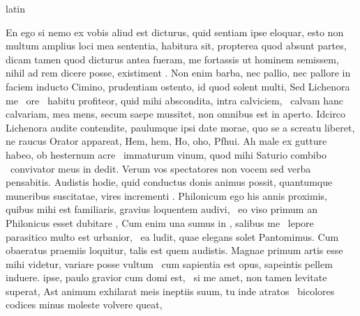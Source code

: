 \documentclass[12pt]{book}
\renewenvironment{latin}
    	{\begin{hyphenrules}{latin}}
    	{\end{hyphenrules}}
\begin{document}
\begin{pages}
\begin{latin}
\begin{Leftside}
                        En ego si nemo ex vobis aliud est dicturus, 
                        quid sentiam ipse eloquar, esto non multum amplius loci mea sententia, habitura sit, 
                        propterea quod absunt partes, 
                        dicam tamen 
                        quod dicturus antea fueram, 
                         me fortassis 
                        ut hominem semissem, nihil ad rem dicere posse, existiment . 
                        Non enim barba, nec pallio, nec pallore in faciem inducto Cimino, prudentiam ostento, id quod solent multi, 
                        Sed Lichenora me ﻿\ampersand\ ore ﻿\ampersand\ habitu profiteor, 
                        quid mihi abscondita, intra calviciem, ﻿\ampersand\ calvam hanc calvariam, mea mens, secum saepe mussitet, non omnibus est in aperto. 
                        Idcirco Lichenora audite contendite, paulumque ipsi date morae, quo se a screatu liberet, 
                        ne raucus Orator appareat, Hem, hem, Ho, oho, Pfhui. 
                        Ah male ex gutture habeo, ob hesternum acre ﻿\ampersand\ immaturum vinum, quod mihi Saturio combibo ﻿\ampersand\ convivator meus in  dedit. 
                        Verum vos spectatores non vocem sed verba pensabitis. 
                        Audistis hodie, 
                        quid conductus donis animus possit, 
                        quantumque muneribus suscitatae, vires incrementi . 
                        Philonicum ego his  annis proximis, 
                        quibus mihi est familiaris,  gravius loquentem audivi, ﻿\ampersand\ eo viso primum an Philonicus esset dubitare , 
                        Cum enim una sumus in , salibus me ﻿\ampersand\ lepore parasitico multo est urbanior, ﻿\ampersand\ ea ludit, 
                        quae elegans solet Pantomimus. 
                        Cum obaeratus praemiis loquitur, talis est quem audistis.  
                         Magnae primum artis esse mihi videtur, variare posse vultum ﻿\ampersand\, cum sapientia est opus, sapeintis pellem induere. 
                         ipse, paulo gravior cum domi est, ﻿\ampersand\ 
                        si me amet, non tamen levitate superat, 
                        Ast animum exhilarat meis ineptiis suum, tu inde atratos ﻿\ampersand\ bicolores codices minus moleste volvere queat, 

\end{Leftside}
\end{latin}
\end{pages}
\end{document}
